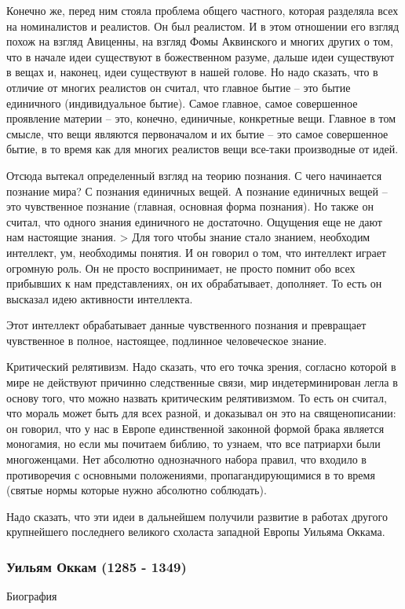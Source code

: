 Конечно же, перед ним стояла проблема общего частного, которая разделяла всех на номиналистов и реалистов. Он был реалистом. И в этом отношении его взгляд похож на взгляд Авиценны, на взгляд Фомы Аквинского и многих других о том, что в начале идеи существуют в божественном разуме, дальше идеи существуют в вещах и, наконец, идеи существуют в нашей голове. Но надо сказать, что в отличие от многих реалистов он считал, что главное бытие – это бытие единичного (индивидуальное бытие). Самое главное, самое совершенное проявление материи – это, конечно, единичные, конкретные вещи. Главное в том смысле, что вещи являются первоначалом и их бытие – это самое совершенное бытие, в то время как для многих реалистов вещи все-таки производные от идей.

Отсюда вытекал определенный взгляд на теорию познания. С чего начинается познание мира? С познания единичных вещей. А познание единичных вещей – это чувственное познание (главная, основная форма познания). Но также он считал, что одного знания единичного не достаточно. Ощущения еще не дают нам настоящие знания. > Для того чтобы знание стало знанием, необходим интеллект, ум, необходимы понятия. И он говорил о том, что интеллект играет огромную роль. Он не просто воспринимает, не просто помнит обо всех прибывших к нам представлениях, он их обрабатывает, дополняет. То есть он высказал идею активности интеллекта.

Этот интеллект обрабатывает данные чувственного познания и превращает чувственное в полное, настоящее, подлинное человеческое знание.

Критический релятивизм. Надо сказать, что его точка зрения, согласно которой в мире не действуют причинно следственные связи, мир индетерминирован легла в основу того, что можно назвать критическим релятивизмом. То есть он считал, что мораль может быть для всех разной, и доказывал он это на священописании: он говорил, что у нас в Европе единственной законной формой брака является моногамия, но если мы почитаем библию, то узнаем, что все патриархи были многоженцами. Нет абсолютно однозначного набора правил, что входило в противоречия с основными положениями, пропагандирующимися в то время (святые нормы которые нужно абсолютно соблюдать).

Надо сказать, что эти идеи в дальнейшем получили развитие в работах другого крупнейшего последнего великого схоласта западной Европы Уильяма Оккама.
\subsubsection{Уильям Оккам (1285 - 1349)}
Биография

